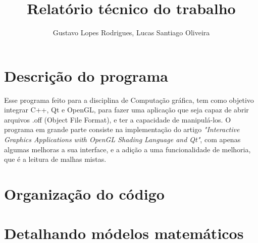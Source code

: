 \documentclass{ol-softwaremanual}
\title{Relatório técnico do trabalho }
\author{Gustavo Lopes Rodrigues, Lucas Santiago Oliveira}
\begin{document}
\maketitle

\tableofcontents
\newpage

\section{Descrição do programa}

Esse programa feito para a disciplina de Computação gráfica, tem como objetivo integrar
C++, Qt e OpenGL, para fazer uma aplicação que seja capaz de abrir arquivos .off (Object File Format),
e ter a capacidade de manipulá-los. O programa em grande parte consiste na implementação do artigo 
\emph{"Interactive Graphics Applications with OpenGL Shading Language and Qt"}, com apenas algumas 
melhoras a sua interface, e a adição a uma funcionalidade de melhoria, que é a leitura de malhas
mistas.

\section{Organização do código}

\section{Detalhando módelos matemáticos}
\end{document}
